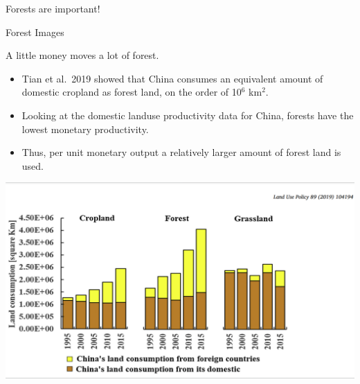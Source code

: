 \documentclass[ignorenonframetext,]{beamer}
\providecommand{\tightlist}{%
  \setlength{\itemsep}{0pt}\setlength{\parskip}{0pt}}
\begin{document}
\begin{frame}{Forests are important!}
\protect\hypertarget{forests-are-important}{}

Forest Images

\end{frame}

\begin{frame}{A little money moves a lot of forest.}
\protect\hypertarget{a-little-money-moves-a-lot-of-forest.}{}

\begin{itemize}
\tightlist
\item
  Tian et al.~2019 showed that China consumes an equivalent amount of
  domestic cropland as forest land, on the order of 10\(^6\) km\(^2\).
\item
  Looking at the domestic landuse productivity data for China, forests
  have the lowest monetary productivity.
\item
  Thus, per unit monetary output a relatively larger amount of forest
  land is used.
\end{itemize}

\begin{center}\includegraphics[width=0.5\linewidth]{images/Tian_2019_Fig1} \end{center}

\end{frame}
\end{document}
